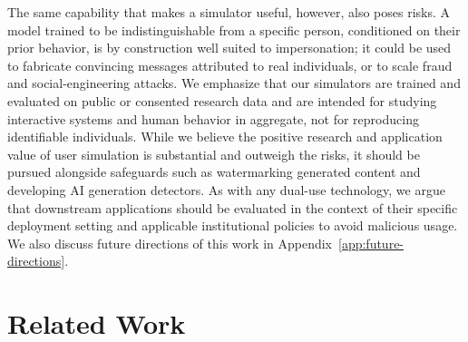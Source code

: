 \documentclass{article} %
\begin{document}
The same capability that makes a simulator useful, however, also poses risks. A model trained to be indistinguishable from a specific person, conditioned on their prior behavior, is by construction well suited to impersonation; it could be used to fabricate convincing messages attributed to real individuals, or to scale fraud and social-engineering attacks. We emphasize that our simulators are trained and evaluated on public or consented research data and are intended for studying interactive systems and human behavior in aggregate, not for reproducing identifiable individuals. While we believe the positive research and application value of user simulation is substantial and outweigh the risks, it should be pursued alongside safeguards such as watermarking generated content and developing AI generation detectors. As with any dual-use technology, we argue that downstream applications should be evaluated in the context of their specific deployment setting and applicable institutional policies to avoid malicious usage. We also discuss future directions of this work in Appendix~\ref{app:future-directions}.






\section{Related Work}
\end{document}
